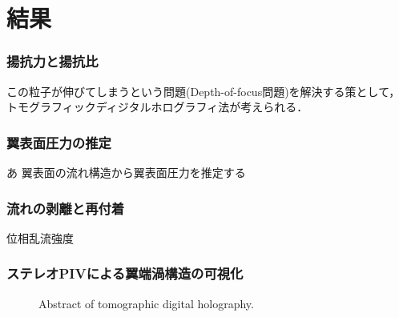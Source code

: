 \section{結果}
\subsubsection{揚抗力と揚抗比}
この粒子が伸びてしまうという問題(Depth-of-focus問題)を解決する策として，トモグラフィックディジタルホログラフィ法が考えられる．

\subsubsection{翼表面圧力の推定}あ
翼表面の流れ構造から翼表面圧力を推定する

\subsubsection{流れの剥離と再付着}
位相乱流強度

\subsubsection{ステレオPIVによる翼端渦構造の可視化}

\begin{figure}[H]
\caption{Abstract of tomographic digital holography.}
\end{figure}
